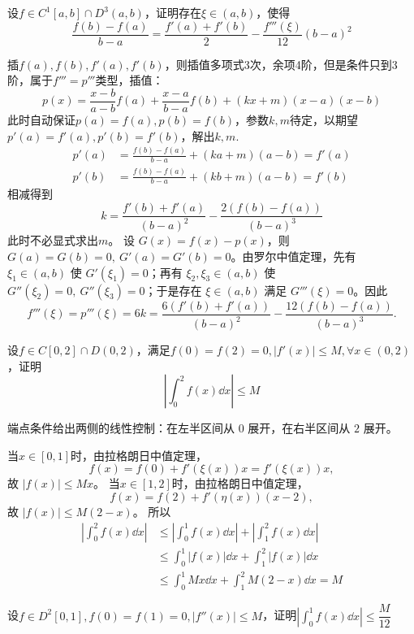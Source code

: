 \begin{example}[$\frac{f(b)-f(a)}{b-a}=\frac{f'(a)+f'(b)}{2}-\frac{f'''(\xi)}{12}(b-a)^2$]
设$f\in C^1[a,b]\cap D^3(a,b)$，证明存在$\xi\in(a,b)$，使得\[\frac{f(b)-f(a)}{b-a}=\frac{f'(a)+f'(b)}{2}-\frac{f'''(\xi)}{12}(b-a)^2\]
\end{example}
\begin{solution}
插$f(a),f(b),f'(a),f'(b)$，则插值多项式3次，余项4阶，但是条件只到3阶，属于$f'''=p'''$类型，插值：
\[p(x)=\frac{x-b}{a-b}f(a)+\frac{x-a}{b-a}f(b)+(kx+m)(x-a)(x-b)\]
此时自动保证$p(a)=f(a),p(b)=f(b)$，参数$k,m$待定，以期望$p'(a)=f'(a),p'(b)=f'(b)$，解出$k,m$.
\begin{align*}
p'(a)&=\frac{f(b)-f(a)}{b-a}+(ka+m)(a-b)=f'(a)\\
p'(b)&=\frac{f(b)-f(a)}{b-a}+(kb+m)(a-b)=f'(b)
\end{align*}
相减得到\[k=\frac{f'(b)+f'(a)}{(b-a)^2}-\frac{2(f(b)-f(a))}{(b-a)^3}\]
此时不必显式求出$m$。
设 $G(x)=f(x)-p(x)$，则 $G(a)=G(b)=0,\ G'(a)=G'(b)=0$。由罗尔中值定理，先有 $\xi_1\in(a,b)$ 使 $G'(\xi_1)=0$；再有 $\xi_2,\xi_3\in(a,b)$ 使 $G''(\xi_2)=0,\ G''(\xi_3)=0$；于是存在 $\xi\in(a,b)$ 满足 $G'''(\xi)=0$。因此
\[
f'''(\xi)=p'''(\xi)=6k=\frac{6(f'(b)+f'(a))}{(b-a)^2}-\frac{12(f(b)-f(a))}{(b-a)^3}.
\]
\end{solution}
\newpage
\begin{example}
设$f\in C[0,2]\cap D(0,2)$，满足$f(0)=f(2)=0,|f'(x)|\leqslant M,\forall x\in(0,2)$，证明\[\left|\int_0^2f(x)\dd x\right|\leqslant M\]
\end{example}
\begin{solution}
    端点条件给出两侧的线性控制：在左半区间从 $0$ 展开，在右半区间从 $2$ 展开。
    
    当$x\in[0,1]$时，由拉格朗日中值定理，
    \[f(x)=f(0)+f'(\xi(x))x=f'(\xi(x))x,\]
    故 \(|f(x)|\leqslant Mx\)。
    当$x\in[1,2]$时，由拉格朗日中值定理，
    \[f(x)=f(2)+f'(\eta(x))(x-2),\]
    故 \(|f(x)|\leqslant M(2-x)\)。
    所以
    \begin{align*}
    \left|\int_0^2f(x)\dd x\right|&\leqslant\left|\int_0^1f(x)\dd x\right|+\left|\int_1^2f(x)\dd x\right|\\
    &\leqslant \int_0^1|f(x)|\dd x+\int_1^2|f(x)|\dd x\\
    &\leqslant \int_0^1Mx\dd x+\int_1^2M(2-x)\dd x=M
    \end{align*}
\end{solution}
\newpage
\begin{example}
设$f\in D^2[0,1],f(0)=f(1)=0,|f''(x)|\leqslant M$，证明$\displaystyle \left|\int_0^1f(x)\dd x\right|\leqslant \dfrac{M}{12}$
\end{example}
